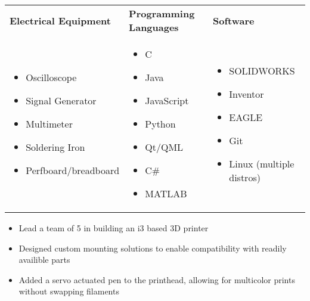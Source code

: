 \documentclass{resume}
\author{Jasper Chan}
\begin{document}
\maketitle

\TechnicalSkills
\begin{table}[H]
	\centering
	\begin{tabularx}{\textwidth}{X X X}
		\textbf{Electrical Equipment} & \textbf{Programming Languages} & \textbf{Software} \\
		\begin{itemize}
			\item Oscilloscope
			\item Signal Generator
			\item Multimeter
			\item Soldering Iron
			\item Perfboard/breadboard
		\end{itemize} & 
		\begin{itemize}
			\item C
			\item Java
			\item JavaScript
			\item Python
			\item Qt/QML
			\item C\#
			\item MATLAB
		\end{itemize} &
		\begin{itemize}
			\item SOLIDWORKS
			\item Inventor
			\item EAGLE
			\item Git
			\item Linux (multiple distros)
		\end{itemize}
	\end{tabularx}
\end{table}
\vspace{-4em} %
\CoopStatus


\TechnicalProjects

\begin{itemize}
	\item Lead a team of 5 in building an i3 based 3D printer
	\item Designed custom mounting solutions to enable compatibility with readily availible parts
	\item Added a servo actuated pen to the printhead, allowing for multicolor prints without swapping filaments
\end{itemize} 
\end{document}
